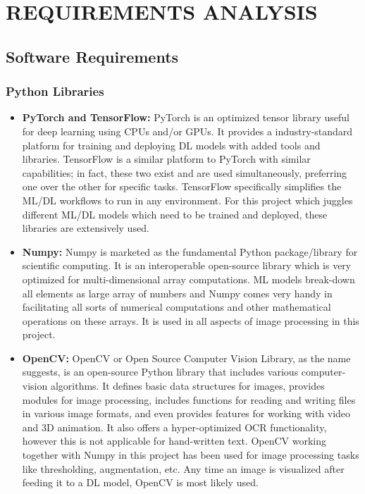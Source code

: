﻿\chapter{REQUIREMENTS ANALYSIS}

\section{Software Requirements}

\subsection{Python Libraries}

\begin{itemize}
    
    \item \textbf{PyTorch and TensorFlow:} PyTorch is an optimized tensor library useful for deep learning using CPUs and/or GPUs. It provides a industry-standard platform for training and deploying DL models with added tools and libraries. TensorFlow is a similar platform to PyTorch with similar capabilities; in fact, these two exist and are used simultaneously, preferring one over the other for specific tasks. TensorFlow specifically simplifies the ML/DL workflows to run in any environment. For this project which juggles different ML/DL models which need to be trained and deployed, these libraries are extensively used.
    
    \item \textbf{Numpy:} Numpy is marketed as the fundamental Python package/library for scientific computing. It is an interoperable open-source library which is very optimized for multi-dimensional array computations. ML models break-down all elements as large array of numbers and Numpy comes very handy in facilitating all sorts of numerical computations and other mathematical operations on these arrays. It is used in all aspects of image processing in this project.  
    
    \item \textbf{OpenCV:} OpenCV or Open Source Computer Vision Library, as the name suggests, is an open-source Python library that includes various computer-vision algorithms. It defines basic data structures for images, provides modules for image processing, includes functions for reading and writing files in various image formats, and even provides features for working with video and 3D animation. It also offers a hyper-optimized OCR functionality, however this is not applicable for hand-written text. OpenCV working together with Numpy in this project has been used for image processing tasks like thresholding, augmentation, etc. Any time an image is visualized after feeding it to a DL model, OpenCV is most likely used.
    

\end{itemize}
